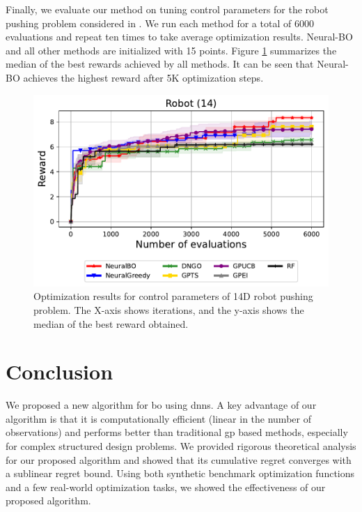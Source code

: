 Finally, we evaluate our method on tuning control parameters for the robot pushing problem considered in \citet{wang2017max}. We run each method for a total of 6000 evaluations and repeat ten times to take average optimization results. Neural-BO and all other methods are initialized with 15 points. Figure \ref{fig:robot_14D} summarizes the median of the best rewards achieved by all methods. It can be seen that Neural-BO achieves the highest reward after 5K optimization steps. 
\begin{figure}[ht]
    \centering
    \includegraphics[width=\textwidth]{Figures/Neural-BO/Neural-BO_Robot_dim_14_round_6000.pdf}
    \vspace{-3mm}
    \caption{
    Optimization results for control parameters of 14D robot pushing problem. The X-axis shows iterations, and the y-axis shows the median of the best reward obtained.}
    \label{fig:robot_14D}
\end{figure}
\section{Conclusion}
We proposed a new algorithm for \acl{bo} using \aclp{dnn}. A key advantage of our algorithm is that it is computationally efficient (linear in the number of observations) and performs better than traditional \acl{gp} based methods, especially for complex structured design problems. We provided rigorous theoretical analysis for our proposed algorithm and showed that its cumulative regret converges with a sublinear regret bound. Using both synthetic benchmark optimization functions and a few real-world optimization tasks, we showed the effectiveness of our proposed algorithm. 